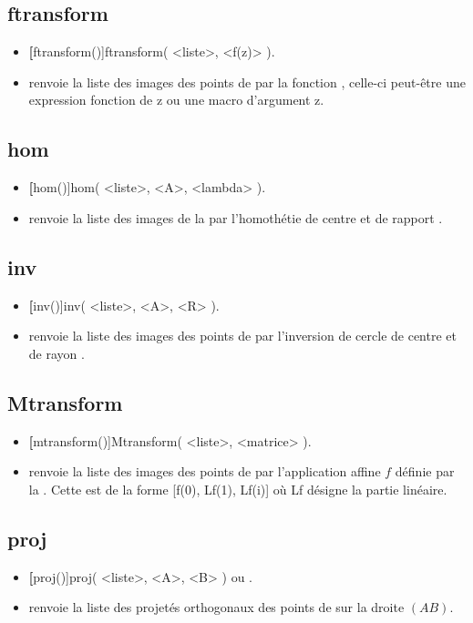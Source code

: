 \subsection{ftransform}
\begin{itemize}
 \item \util \textbf[ftransform()]{ftransform( <liste>, <f(z)> )}.
 \item \desc renvoie la liste des images des points de  par la fonction , celle-ci peut-être une expression fonction de z ou une macro d'argument z.
\end{itemize}

\subsection{hom}
\begin{itemize}
 \item \util \textbf[hom()]{hom( <liste>, <A>, <lambda> )}.
 \item \desc renvoie la liste des images de la  par l'homothétie de centre  et de rapport
.
\end{itemize}

\subsection{inv}
\begin{itemize}
 \item \util \textbf[inv()]{inv( <liste>, <A>, <R> )}.
 \item \desc renvoie la liste des images des points de  par l'inversion de cercle de centre  et de rayon .
\end{itemize}

\subsection{Mtransform}
\begin{itemize}
 \item \util \textbf[mtransform()]{Mtransform( <liste>, <matrice> )}.
 \item \desc renvoie la liste des images des points de  par l'application affine $f$ définie par la . Cette  est de la forme [f(0), Lf(1), Lf(i)] où Lf désigne la partie linéaire.
\end{itemize}

\subsection{proj}
\begin{itemize}
 \item \util \textbf[proj()]{proj( <liste>, <A>, <B> )} ou .
 \item \desc renvoie la liste des projetés orthogonaux des points de  sur la droite $(AB)$.
\end{itemize}


